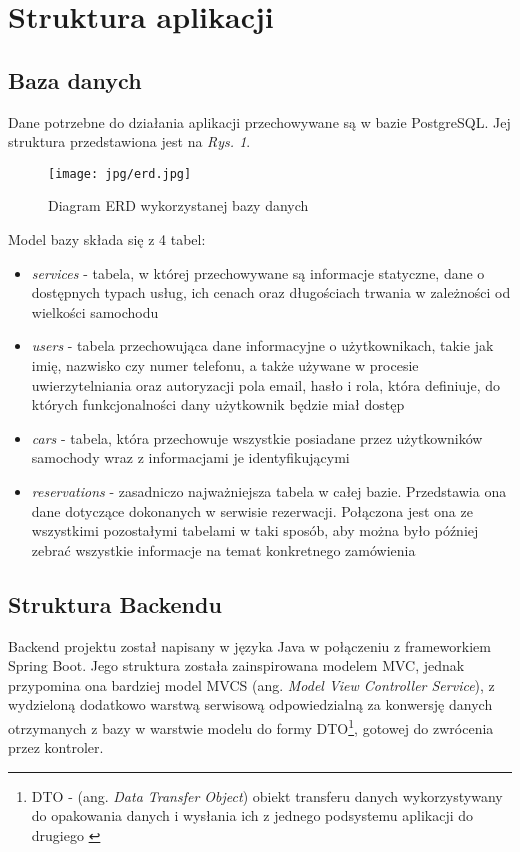 \documentclass[11pt,a4paper]{article}
\begin{document}
\newpage
\section{Struktura aplikacji}
\subsection{Baza danych}

Dane potrzebne do działania aplikacji przechowywane są w bazie PostgreSQL. 
Jej struktura przedstawiona jest na \textsl{Rys. 1}.

\begin{figure}[H]
\centering
\texttt{[image: jpg/erd.jpg]}
\caption{Diagram ERD wykorzystanej bazy danych}
\end{figure}

\noindent
Model bazy składa się z 4 tabel: 
\begin{itemize}
    \item \textsl{services} - tabela, w której przechowywane są informacje statyczne, dane o dostępnych typach usług, ich cenach oraz długościach trwania w zależności od wielkości samochodu
    \item \textsl{users} - tabela przechowująca dane informacyjne o użytkownikach, takie jak imię, nazwisko czy numer telefonu, a także używane w procesie uwierzytelniania oraz autoryzacji pola email, hasło i rola, która definiuje, do których funkcjonalności dany użytkownik będzie miał dostęp
    \item \textsl{cars} - tabela, która przechowuje wszystkie posiadane przez użytkowników samochody wraz z informacjami je identyfikującymi
    \item \textsl{reservations} - zasadniczo najważniejsza tabela w całej bazie. Przedstawia ona dane dotyczące dokonanych w serwisie rezerwacji. Połączona jest ona ze wszystkimi pozostałymi tabelami w taki sposób, aby można było później zebrać wszystkie informacje na temat konkretnego zamówienia
\end{itemize}

\subsection{Struktura Backendu}
            Backend projektu został napisany w języka Java w połączeniu z frameworkiem Spring Boot. Jego struktura została zainspirowana modelem MVC, jednak przypomina ona bardziej model MVCS (ang. \textsl{Model View Controller Service}), z wydzieloną dodatkowo warstwą serwisową odpowiedzialną za konwersję danych otrzymanych z bazy w warstwie modelu do formy DTO\footnote{DTO - (ang. \textsl{Data Transfer Object}) obiekt transferu danych wykorzystywany do opakowania danych i wysłania ich z jednego podsystemu aplikacji do drugiego \cite{dto}}, gotowej do zwrócenia przez kontroler. \\
\end{document}
